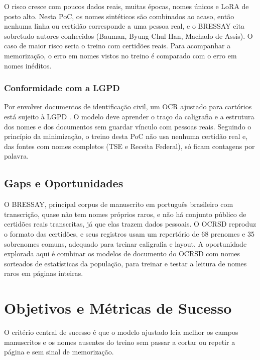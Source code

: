 \documentclass[12pt,a4paper]{article}
\begin{document}
O risco cresce com poucos dados reais, muitas épocas, nomes únicos e LoRA de posto alto. Nesta PoC, os nomes sintéticos são combinados ao acaso, então nenhuma linha ou certidão corresponde a uma pessoa real, e o BRESSAY cita sobretudo autores conhecidos (Bauman, Byung-Chul Han, Machado de Assis). O caso de maior risco seria o treino com certidões reais. Para acompanhar a memorização, o erro em nomes vistos no treino é comparado com o erro em nomes inéditos.

\subsubsection{Conformidade com a LGPD}
Por envolver documentos de identificação civil, um OCR ajustado para cartórios está sujeito à LGPD \cite{lgpd2018}. O modelo deve aprender o traço da caligrafia e a estrutura dos nomes e dos documentos sem guardar vínculo com pessoas reais. Seguindo o princípio da minimização, o treino desta PoC não usa nenhuma certidão real e, das fontes com nomes completos (TSE e Receita Federal), só ficam contagens por palavra.

\subsection{Gaps e Oportunidades}

O BRESSAY, principal corpus de manuscrito em português brasileiro com transcrição, quase não tem nomes próprios raros, e não há conjunto público de certidões reais transcritas, já que elas trazem dados pessoais. O OCRSD reproduz o formato das certidões, e seus registros usam um repertório de 68 prenomes e 35 sobrenomes comuns, adequado para treinar caligrafia e layout. A oportunidade explorada aqui é combinar os modelos de documento do OCRSD com nomes sorteados de estatísticas da população, para treinar e testar a leitura de nomes raros em páginas inteiras.

\section{Objetivos e Métricas de Sucesso}
\label{sec:objetivos}

O critério central de sucesso é que o modelo ajustado leia melhor os campos manuscritos e os nomes ausentes do treino sem passar a cortar ou repetir a página e sem sinal de memorização.
\end{document}
